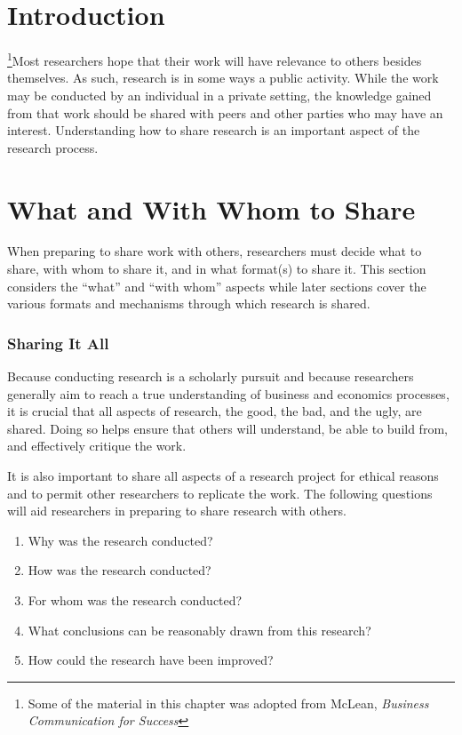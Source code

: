 \section{Introduction}

\footnote{Some of the material in this chapter was adopted from McLean, \textit{Business Communication for Success}\cite{mclean2012business}}Most researchers hope that their work will have relevance to others besides themselves. As such, research is in some ways a public activity. While the work may be conducted by an individual in a private setting, the knowledge gained from that work should be shared with  peers and other parties who may have an interest. Understanding how to share research is an important aspect of the research process.

\section{What and With Whom to Share}

When preparing to share work with others, researchers must decide what to share, with whom to share it, and in what format(s) to share it. This section considers the ``what'' and ``with whom'' aspects while later sections cover the various formats and mechanisms through which research is shared.

\subsubsection{Sharing It All}

Because conducting research is a scholarly pursuit and because researchers generally aim to reach a true understanding of business and economics processes, it is crucial that all aspects of research, the good, the bad, and the ugly, are shared. Doing so helps ensure that others will understand, be able to build from, and effectively critique the work.

It is also important to share all aspects of a research project for ethical reasons and to permit other researchers to replicate the work. The following questions will aid researchers in preparing to share research with others.

\begin{enumerate}
	\item Why was the research conducted?
	\item How was the research conducted?
	\item For whom was the research conducted?
	\item What conclusions can be reasonably drawn from this research?
	\item How could the research have been improved?
\end{enumerate}


